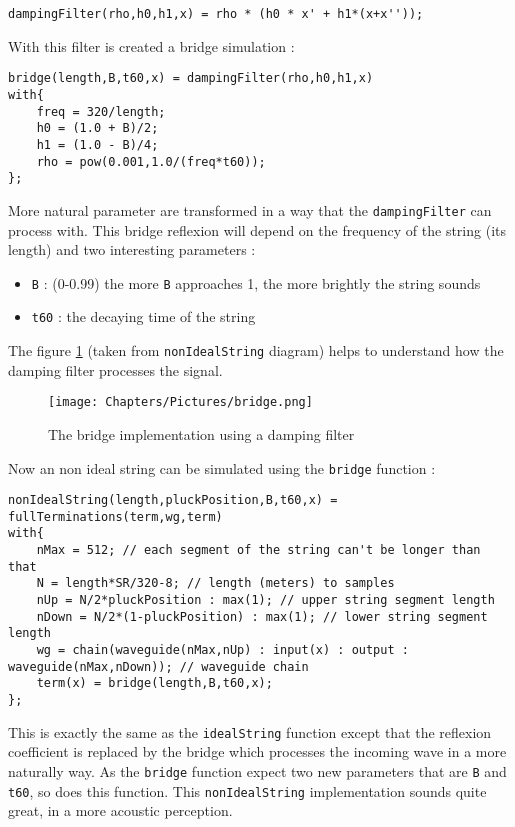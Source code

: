 \begin{lstlisting}
dampingFilter(rho,h0,h1,x) = rho * (h0 * x' + h1*(x+x''));
\end{lstlisting}

With this filter is created a bridge simulation :\\

\begin{lstlisting}
bridge(length,B,t60,x) = dampingFilter(rho,h0,h1,x)
with{
	freq = 320/length;
	h0 = (1.0 + B)/2;
	h1 = (1.0 - B)/4;
	rho = pow(0.001,1.0/(freq*t60));
};
\end{lstlisting}

More natural parameter are transformed in a way that the \texttt{dampingFilter} can process with. This bridge reflexion will depend on the frequency of the string (its length) and two interesting parameters :
\begin{itemize}
    \item \texttt{B} : (0-0.99) the more \texttt{B} approaches 1, the more brightly the string sounds
    \item \texttt{t60} : the decaying time of the string
\end{itemize}
The figure \ref{fig:bridge} (taken from \texttt{nonIdealString} diagram) helps to understand how the damping filter processes the signal.

\begin{figure}[h]
    \centering
    \texttt{[image: Chapters/Pictures/bridge.png]}
    \caption{The bridge implementation using a damping filter}
    \label{fig:bridge}
\end{figure}

Now an non ideal string can be simulated using the \texttt{bridge} function :\\

\begin{lstlisting}
nonIdealString(length,pluckPosition,B,t60,x) = fullTerminations(term,wg,term)
with{
	nMax = 512; // each segment of the string can't be longer than that
	N = length*SR/320-8; // length (meters) to samples
	nUp = N/2*pluckPosition : max(1); // upper string segment length
	nDown = N/2*(1-pluckPosition) : max(1); // lower string segment length
	wg = chain(waveguide(nMax,nUp) : input(x) : output : waveguide(nMax,nDown)); // waveguide chain
	term(x) = bridge(length,B,t60,x);
};
\end{lstlisting}

This is exactly the same as the \texttt{idealString} function except that the reflexion coefficient is replaced by the bridge which processes the incoming wave in a more naturally way. As the \texttt{bridge} function expect two new parameters that are \texttt{B} and \texttt{t60}, so does this function. This \texttt{nonIdealString} implementation sounds quite great, in a more acoustic perception.

